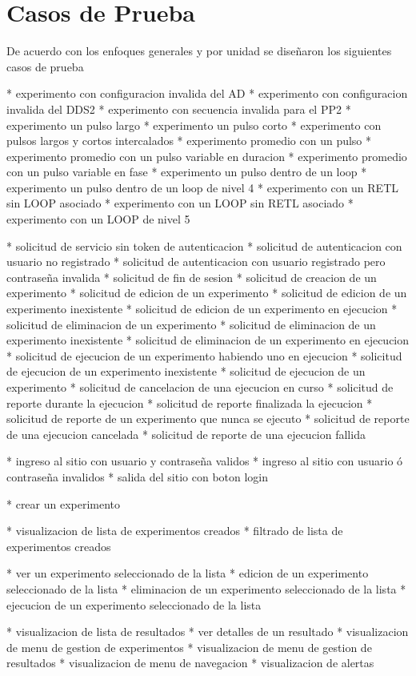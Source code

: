 \section{Casos de Prueba}

De acuerdo con los enfoques generales y por unidad se diseñaron los siguientes casos de prueba

* experimento con configuracion invalida del AD
* experimento con configuracion invalida del DDS2
* experimento con secuencia invalida para el PP2
* experimento un pulso largo
* experimento un pulso corto
* experimento con pulsos largos y cortos intercalados
* experimento promedio con un pulso
* experimento promedio con un pulso variable en duracion
* experimento promedio con un pulso variable en fase
* experimento un pulso dentro de un loop
* experimento un pulso dentro de un loop de nivel 4
* experimento con un RETL sin LOOP asociado
* experimento con un LOOP sin RETL asociado
* experimento con un LOOP de nivel 5

* solicitud de servicio sin token de autenticacion
* solicitud de autenticacion con usuario no registrado
* solicitud de autenticacion con usuario registrado pero contraseña invalida
* solicitud de fin de sesion
* solicitud de creacion de un experimento
* solicitud de edicion de un experimento
* solicitud de edicion de un experimento inexistente
* solicitud de edicion de un experimento en ejecucion
* solicitud de eliminacion de un experimento
* solicitud de eliminacion de un experimento inexistente
* solicitud de eliminacion de un experimento en ejecucion
* solicitud de ejecucion de un experimento habiendo uno en ejecucion
* solicitud de ejecucion de un experimento inexistente
* solicitud de ejecucion de un experimento
* solicitud de cancelacion de una ejecucion en curso
* solicitud de reporte durante la ejecucion
* solicitud de reporte finalizada la ejecucion
* solicitud de reporte de un experimento que nunca se ejecuto
* solicitud de reporte de una ejecucion cancelada
* solicitud de reporte de una ejecucion fallida


* ingreso al sitio con usuario y contraseña validos
* ingreso al sitio con usuario ó contraseña invalidos
* salida del sitio con boton login

* crear un experimento

* visualizacion de lista de experimentos creados
* filtrado de lista de experimentos creados

* ver un experimento seleccionado de la lista
* edicion de un experimento seleccionado de la lista
* eliminacion de un experimento seleccionado de la lista
* ejecucion de un experimento seleccionado de la lista



* visualizacion de lista de resultados
* ver detalles de un resultado
* visualizacion de menu de gestion de experimentos
* visualizacion de menu de gestion de resultados
* visualizacion de menu de navegacion
* visualizacion de alertas
